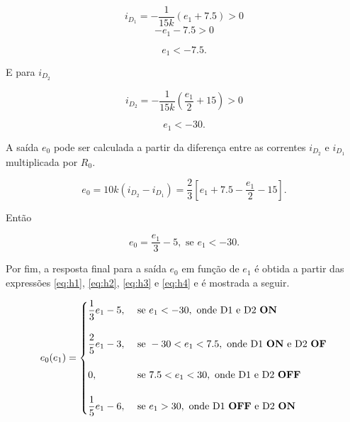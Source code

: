 \documentclass{article}
\numberwithin{equation}{section}
\let\l\left
\let\r\right
\let\dfr\dfrac
\begin{document}
\begin{equation*}
    i_{D_1} = -\dfr{1}{15k}(e_1+7.5)>0
\end{equation*}
\begin{equation*}
    -e_1-7.5>0
\end{equation*}

\begin{equation*}
    e_1<-7.5.
\end{equation*}

\noindent E para $i_{D_2}$

\begin{equation*}
    i_{D_2} = -\dfr{1}{15k}\l(\dfr{e_1}{2}+15\r)>0
\end{equation*}

\begin{equation*}
    e_1<-30.
\end{equation*}

\noindent A saída $e_0$ pode ser calculada a partir da diferença entre as correntes $i_{D_2}$ e $i_{D_1}$ multiplicada por $R_0$.

\begin{equation*}
    e_0 = 10k(i_{D_2}-i_{D_1}) = \dfr{2}{3}\l[e_1+7.5-\dfr{e_1}{2}-15\r].
\end{equation*}

\noindent Então

\begin{equation}
\label{eq:h4}
    e_0 = \dfr{e_1}{3}-5, \text{ se }  e_1<-30.
\end{equation}

\noindent Por fim, a resposta final para a saída $e_0$ em função de $e_1$ é obtida a partir das expressões \eqref{eq:h1}, \eqref{eq:h2}, \eqref{eq:h3} e \eqref{eq:h4} e é mostrada a seguir.


    \begin{center}
        \[e_0(e_1) =
        \begin{cases}

            \dfrac{1}{3}e_1-5,& \text{ se }  e_1<-30, \text{ onde D1 e D2 \textbf{ON}}\\ \\

            \dfrac{2}{5}e_1-3,& \text{ se }  -30<e_1<7.5, \text{ onde D1 \textbf{ON} e D2 \textbf{OF}}\\ \\

            0,& \text{ se }  7.5<e_1<30, \text{ onde D1 e D2 \textbf{OFF}}\\ \\

            \dfrac{1}{5}e_1-6,& \text{ se }  e_1>30, \text{ onde D1 \textbf{OFF} e D2 \textbf{ON}}

        \end{cases}
        \]
    \end{center}
\end{document}

